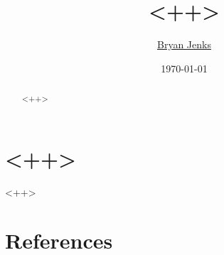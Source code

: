 \documentclass[10pt]{article}
\title{<++>}
\author{\href{mailto:bryanjenks@protonmail.com}{Bryan Jenks}}
\date{\today}
\begin{document}
    \maketitle
    \begin{abstract}
        <++>
    \end{abstract}
    \pagebreak

    \tableofcontents
    \pagebreak
    \listoffigures
    \pagebreak
    \listoftables
    \pagebreak

    \section{<++>}

    <++>

    \pagebreak
    \section{References}
    \printbibliography

    \pagebreak
    \appendix
    \appendixpage
    \addappheadtotoc
\end{document}
